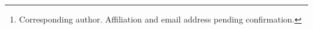 \author{Chunlei Wu \and Yinghao Xu \and Jing Lu\thanks{Corresponding author. Affiliation and email address pending confirmation.}}
